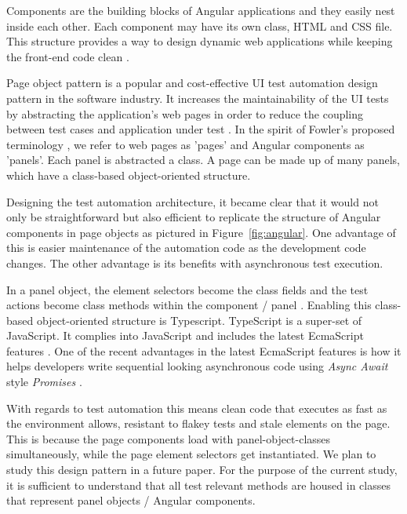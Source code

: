 \documentclass[conference]{IEEEtran}
\begin{document}
	Components are the building blocks of Angular applications and they easily nest inside each other.
	Each component may have its own class, HTML and CSS file. This structure provides a way to design dynamic web applications while keeping the front-end code clean \cite{wiki:angular}. 

	Page object pattern is a popular and cost-effective UI test automation design pattern in the software industry.
	It increases the maintainability of the UI tests by abstracting the application's web pages in order to reduce the coupling between test cases and application under test \cite{leotta2013improving}.
	In the spirit of Fowler's proposed terminology \cite{fowler:pageobject}, we refer to web pages as 'pages' and Angular components as 'panels'.
	Each panel is abstracted a class. A page can be made up of many panels, which have a class-based object-oriented structure.   

	Designing the test automation architecture, it became clear that it would not only be straightforward but also efficient to replicate the structure of Angular components in page objects as pictured in Figure~\ref{fig:angular}.
	One advantage of this is easier maintenance of the automation code as the development code changes.
	The other advantage is its benefits with asynchronous test execution.

	In a panel object, the element selectors become the class fields and the test actions become class methods within the component / panel \cite{protractorstyleguide}.
	Enabling this class-based object-oriented structure is Typescript.
	TypeScript is a super-set of JavaScript. It complies into JavaScript and includes the latest EcmaScript features \cite{wiki:typescript}.
	One of the recent advantages in the latest EcmaScript features is how it helps developers write sequential looking asynchronous code using \emph{Async Await} style \emph{Promises} \cite{wiki:ECMAscript}.

	With regards to test automation this means clean code that executes as fast as the environment allows, resistant to flakey tests \cite{fowler:flake} and stale elements on the page. 
	This is because the page components load with panel-object-classes simultaneously, while the page element selectors get instantiated.
	We plan to study this design pattern in a future paper. For the purpose of the current study, it is sufficient to understand that all test relevant methods are housed in classes that represent panel objects / Angular components.
		
\end{document}
